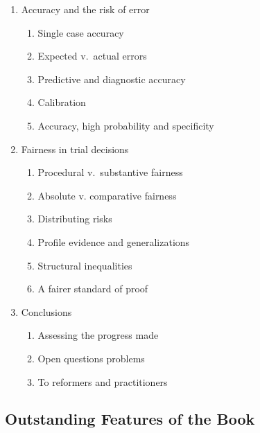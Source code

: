 \documentclass[
  10pt,
  dvipsnames,enabledeprecatedfontcommands]{scrartcl}
\begin{document}
\begin{multicols}{2}
\begin{enumerate}
\begin{enumerate}
  \item  Accuracy and the risk of error
  \begin{enumerate}
  \item  Single case accuracy
  \item  Expected v.\ actual errors
  \item  Predictive and diagnostic accuracy
  \item  Calibration
  \item  Accuracy, high probability and specificity 
  \end{enumerate}


  \item  Fairness in trial decisions
  \begin{enumerate}
  \item  Procedural v.\ substantive fairness
  \item  Absolute v. comparative fairness 
  \item  Distributing risks
  \item  Profile evidence and generalizations
  \item  Structural inequalities 
  \item  A fairer standard of proof
  \end{enumerate}


\item Conclusions
\begin{enumerate}
\item  Assessing the progress made
\item  Open questions problems 
\item  To reformers and practitioners
\end{enumerate}
\end{enumerate}
\end{enumerate}

\end{multicols}

\normalsize

\hypertarget{outstanding-features-of-the-book}{%
\subsection{Outstanding Features of the
Book}\label{outstanding-features-of-the-book}}
\end{document}
